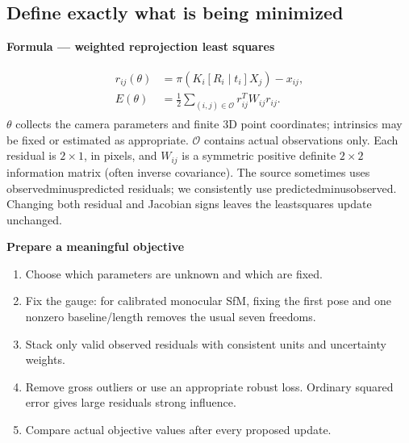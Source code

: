 \documentclass[letterpaper,11pt,english,openany,oneside]{jupyterBook}
\begin{document}
\subsection{Define exactly what is being minimized}
\label{\detokenize{lectures/lecture06/optimization:define-exactly-what-is-being-minimized}}
\begin{TextbookBox}
\textbf{Formula — weighted reprojection least squares}\par\smallskip
\begin{equation}\label{equation:lectures/lecture06/optimization:eq-lec06-ba}
\begin{split}\begin{aligned}
r_{ij}(\theta)&=\pi(K_i[R_i\mid t_i]X_j)-x_{ij},\\
E(\theta)&=\tfrac12\sum_{(i,j)\in\mathcal O}r_{ij}^TW_{ij}r_{ij}.
\end{aligned}\end{split}
\end{equation}
\sphinxAtStartPar
\(\theta\) collects the camera parameters and finite 3D point coordinates; intrinsics may be fixed or estimated as appropriate. \(\mathcal O\) contains actual observations only. Each residual is \(2\times1\), in pixels, and \(W_{ij}\) is a symmetric positive definite \(2\times2\) information matrix (often inverse covariance). The source sometimes uses observed\sphinxhyphen{}minus\sphinxhyphen{}predicted residuals; we consistently use predicted\sphinxhyphen{}minus\sphinxhyphen{}observed. Changing both residual and Jacobian signs leaves the least\sphinxhyphen{}squares update unchanged.

\end{TextbookBox}

\begin{TextbookBox}
\textbf{Prepare a meaningful objective}\par\smallskip
\begin{enumerate}
%
\item {}
\sphinxAtStartPar
Choose which parameters are unknown and which are fixed.

\item {}
\sphinxAtStartPar
Fix the gauge: for calibrated monocular SfM, fixing the first pose and one nonzero baseline/length removes the usual seven freedoms.

\item {}
\sphinxAtStartPar
Stack only valid observed residuals with consistent units and uncertainty weights.

\item {}
\sphinxAtStartPar
Remove gross outliers or use an appropriate robust loss. Ordinary squared error gives large residuals strong influence.

\item {}
\sphinxAtStartPar
Compare actual objective values after every proposed update.

\end{enumerate}

\end{TextbookBox}
\end{document}

